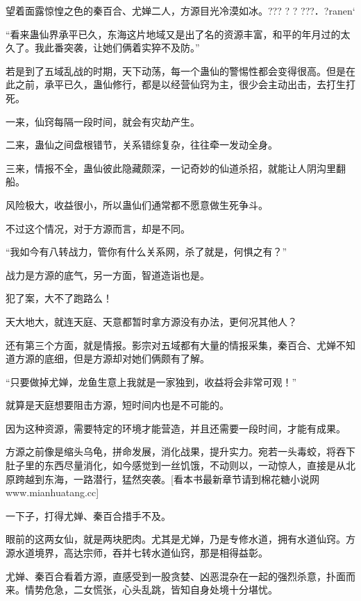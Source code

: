 
\begin{this_body}

望着面露惊惶之色的秦百合、尤婵二人，方源目光冷漠如冰。??? ? ?  ???．?ranen`

“看来蛊仙界承平已久，东海这片地域又是出了名的资源丰富，和平的年月过的太久了。我此番突袭，让她们俩着实猝不及防。”

若是到了五域乱战的时期，天下动荡，每一个蛊仙的警惕性都会变得很高。但是在此之前，承平已久，蛊仙修行，都是以经营仙窍为主，很少会主动出击，去打生打死。

一来，仙窍每隔一段时间，就会有灾劫产生。

二来，蛊仙之间盘根错节，关系错综复杂，往往牵一发动全身。

三来，情报不全，蛊仙彼此隐藏颇深，一记奇妙的仙道杀招，就能让人阴沟里翻船。

风险极大，收益很小，所以蛊仙们通常都不愿意做生死争斗。

不过这个情况，对于方源而言，却是不同。

“我如今有八转战力，管你有什么关系网，杀了就是，何惧之有？”

战力是方源的底气，另一方面，智道造诣也是。

犯了案，大不了跑路么！

天大地大，就连天庭、天意都暂时拿方源没有办法，更何况其他人？

还有第三个方面，就是情报。影宗对五域都有大量的情报采集，秦百合、尤婵不知道方源的底细，但是方源却对她们俩颇有了解。

“只要做掉尤婵，龙鱼生意上我就是一家独到，收益将会非常可观！”

就算是天庭想要阻击方源，短时间内也是不可能的。

因为这种资源，需要特定的环境才能营造，并且还需要一段时间，才能有成果。

方源之前像是缩头乌龟，拼命发展，消化战果，提升实力。宛若一头毒蛟，将吞下肚子里的东西尽量消化，如今感觉到一丝饥饿，不动则以，一动惊人，直接是从北原跨越到东海，一路潜行，猛然突袭。[看本书最新章节请到棉花糖小说网www.mianhuatang.cc]

一下子，打得尤婵、秦百合措手不及。

眼前的这两女仙，就是两块肥肉。尤其是尤婵，乃是专修水道，拥有水道仙窍。方源水道境界，高达宗师，吞并七转水道仙窍，那是相得益彰。

尤婵、秦百合看着方源，直感受到一股贪婪、凶恶混杂在一起的强烈杀意，扑面而来。情势危急，二女慌张，心头乱跳，皆知自身处境十分堪忧。


\end{this_body}
